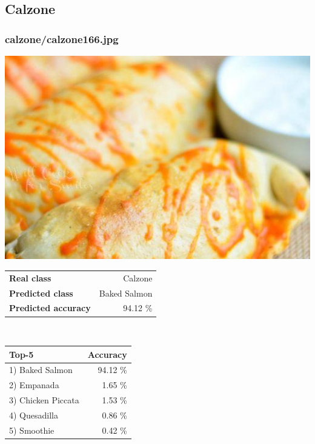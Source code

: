 \subsection{Calzone}
    
\subsubsection{calzone/calzone166.jpg}

\begin{minipage}[t]{0.4\textwidth}
	\vspace{0pt}
	\includegraphics[width=\linewidth]{images/evaluation-images/calzone/calzone166.jpg}
\end{minipage}
\hfill
\begin{minipage}[t]{0.5\textwidth}
	\vspace{0pt}\raggedright
	\begin{tabularx}{\textwidth}{X r}
		\small \textbf{Real class} & \small Calzone\\
		\small \textbf{Predicted class} & \small Baked Salmon\\
		\small \textbf{Predicted accuracy} & \small 94.12 \%
    \end{tabularx}\\
    
    \vspace{6pt}
	\begin{tabularx}{\textwidth}{X r}
        \small \textbf{Top-5} & \small \textbf{Accuracy} \\
        \hline
		\small 1) Baked Salmon & \small 94.12 \%\\\small 2) Empanada & \small 1.65 \%\\\small 3) Chicken Piccata & \small 1.53 \%\\\small 4) Quesadilla & \small 0.86 \%\\\small 5) Smoothie & \small 0.42 \%
    \end{tabularx}
\end{minipage}
    
